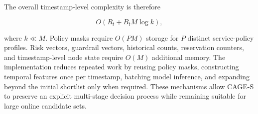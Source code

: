 The overall timestamp-level complexity is therefore

\begin{equation}
\label{eq:method-complexity}
    O
    \left(
        R_t+
        B_tM\log k
    \right),
\end{equation}

where $k\ll M$. Policy masks require $O(PM)$ storage for $P$ distinct
service-policy profiles. Risk vectors, guardrail vectors, historical
counts, reservation counters, and timestamp-level node state require
$O(M)$ additional memory. The implementation reduces repeated work by reusing policy masks,
constructing temporal features once per timestamp, batching model
inference, and expanding beyond the initial shortlist only when required.
These mechanisms allow CAGE-S to preserve an explicit multi-stage
decision process while remaining suitable for large online candidate
sets.